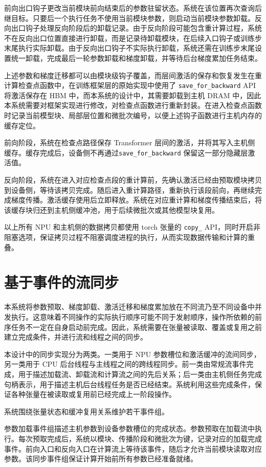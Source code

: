 \documentclass[bachelor,openany,oneside,color,AutoFakeBold=true]{buaathesis}
\begin{document}
前向出口钩子更改当前模块前向结束后的参数驻留状态。系统在该位置再次查询后继目标。只要后一个执行任务不使用当前模块参数，则启动当前模块参数卸载。反向出口钩子处理反向阶段后的卸载记录。由于反向阶段可能包含重计算过程，系统不在反向出口位置直接进行卸载，而是记录待卸载模块，在后续入口钩子或训练步末尾执行实际卸载。由于反向出口钩子不实际执行卸载，系统还需在训练步末尾设置统一卸载，完成最后一轮参数卸载和梯度卸载，并等待后台梯度累加任务结束。

上述参数和梯度迁移都可以由模块级钩子覆盖，而层间激活的保存和恢复发生在重计算检查点函数中，在训练框架层的原始实现中使用了 \texttt{save\_for\_backward} API 将激活保存在 HBM 中，而本系统的设计中，其需要卸载到主机 DRAM 中，因此本系统需要对框架实现进行修改，对检查点函数进行重新封装。在进入检查点函数时记录当前模型块、局部层位置和微批次编号，以便上述钩子函数进行主机内存的缓存定位。

前向阶段，系统在检查点路径保存 Transformer 层间的激活，并将其写入主机侧缓存。缓存完成后，设备侧不再通过\texttt{save\_for\_backward} 保留这一部分隐藏层激活值。

反向阶段，系统在进入对应检查点段的重计算前，先确认激活已经由预取模块拷贝到设备侧，等待该拷贝完成。随后进入重计算路径，重新执行该段前向，再继续完成梯度传播。激活缓存使用后立即释放。系统在对应重计算和梯度传播结束后，将该缓存块归还到主机侧缓冲池，用于后续微批次或其他模型块复用。

以上所有 NPU 和主机侧的数据拷贝都使用 torch 张量的 \texttt{copy\_} API，同时开启非阻塞选项，保证拷贝过程不阻塞调度进程的执行，从而实现数据传输和计算的重叠。


\section{基于事件的流同步}

本系统将参数预取、梯度卸载、激活迁移和梯度累加放在不同流乃至不同设备中并发执行。这意味着不同操作的实际执行顺序可能不同于发射顺序，操作所依赖的前序任务不一定在自身启动前完成。因此，系统需要在张量被读取、覆盖或复用之前建立完成条件，并进行流和线程之间的同步。

本设计中的同步实现分为两类。一类用于 NPU 参数槽位和激活缓冲的流间同步，另一类用于 CPU 后台线程与主线程之间的跨线程同步。前一类由常规流事件完成，用于描述加载流、卸载流和计算流之间的先后关系；后一类由主机侧任务完成句柄表示，用于描述主机后台线程任务是否已经结束。系统利用这些完成条件，保证各种张量在被读取或复用前已经完成上一阶段操作。

系统围绕张量状态和缓冲复用关系维护若干事件组。

参数加载事件组描述主机参数到设备参数槽位的完成状态。参数预取在加载流中执行。每次预取完成后，系统以模块、传播阶段和微批次为键，记录对应的加载完成事件。前向入口和反向入口在计算流上等待该事件，随后才允许当前模块读取对应参数。该同步事件组保证计算开始前所有参数已经准备就绪。
\end{document}
